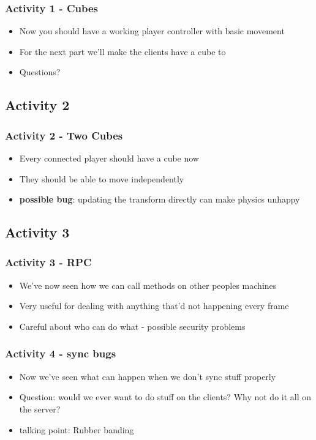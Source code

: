 \documentclass{beamer}
\begin{document}
	\begin{frame}
		\frametitle{Activity 1 - Cubes}
		
		\begin{itemize}
			\item Now you should have a working player controller with basic movement
			\item For the next part we'll make the clients have a cube to
			\item Questions?
		\end{itemize}
	\end{frame}
	
	\subsection{Activity 2}
	
	\begin{frame}
		\frametitle{Activity 2 - Two Cubes}
		
		\begin{itemize}
			\item Every connected player should have a cube now
			\item They should be able to move independently
			\item \textbf{possible bug}: updating the transform directly can make physics unhappy 
		\end{itemize}
	\end{frame}
	
	\subsection{Activity 3}
	
	\begin{frame}
		\frametitle{Activity 3 - RPC }
		
		\begin{itemize}
			\item We've now seen how we can call methods on other peoples machines
			\item Very useful for dealing with anything that'd not happening every frame
			\item Careful about who can do what - possible security problems
		\end{itemize}
	
	\end{frame}

	\begin{frame}
		\frametitle{Activity 4 - sync bugs}
		
		\begin{itemize}
			\item Now we've seen what can happen when we don't sync stuff properly
			\item Question: would we ever want to do stuff on the clients? Why not do it all on the server?
			\item talking point: Rubber banding
		\end{itemize}
		
	\end{frame}
	
\end{document}
